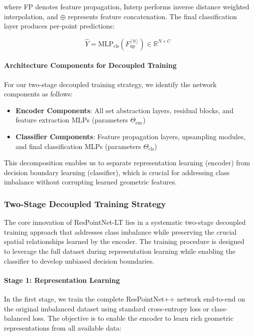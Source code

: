 \documentclass[preprint,12pt]{elsarticle}
\begin{document}
where FP denotes feature propagation, Interp performs inverse distance weighted interpolation, and $\oplus$ represents feature concatenation. The final classification layer produces per-point predictions:

\begin{equation}
\hat{Y} = \text{MLP}_{\text{cls}}(F_{\text{up}}^{[0]}) \in \mathbb{R}^{N \times C}
\end{equation}

\paragraph{Architecture Components for Decoupled Training}
For our two-stage decoupled training strategy, we identify the network components as follows:
\begin{itemize}
    \item \textbf{Encoder Components}: All set abstraction layers, residual blocks, and feature extraction MLPs (parameters $\Theta_{\text{enc}}$)
    \item \textbf{Classifier Components}: Feature propagation layers, upsampling modules, and final classification MLPs (parameters $\Theta_{\text{cls}}$)
\end{itemize}

This decomposition enables us to separate representation learning (encoder) from decision boundary learning (classifier), which is crucial for addressing class imbalance without corrupting learned geometric features.

\subsubsection{Two-Stage Decoupled Training Strategy}
\label{sec:decoupled_training}

The core innovation of ResPointNet-LT lies in a systematic two-stage decoupled training approach that addresses class imbalance while preserving the crucial spatial relationships learned by the encoder. The training procedure is designed to leverage the full dataset during representation learning while enabling the classifier to develop unbiased decision boundaries.

\paragraph{Stage 1: Representation Learning}
In the first stage, we train the complete ResPointNet++ network end-to-end on the original imbalanced dataset using standard cross-entropy loss or class-balanced loss. The objective is to enable the encoder to learn rich geometric representations from all available data:
\end{document}
